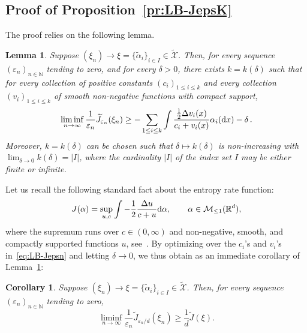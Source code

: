 \documentclass[a4paper,11pt]{amsart}
\numberwithin{equation}{section}
\newtheorem{lemma}[theorem]{Lemma}
\newtheorem{corollary}[theorem]{Corollary}
\newcommand{\bbR}{{\ensuremath{\mathbb R}} }
\newcommand{\cM}{{\ensuremath{\mathcal M}} }
\newcommand{\cX}{{\ensuremath{\mathcal X}} }
\newcommand{\ga}{\alpha}
\newcommand{\gd}{\delta}
\newcommand{\gD}{\Delta}
\newcommand{\gep}{\varepsilon}
\renewcommand{\tilde}{\widetilde}          %
\newcommand{\dd}{\text{\rm d}}             %
\newcommand{\N}{\mathbb{N}}
\newcommand{\8}{\infty}
\newcommand{\beq}{\begin{equation}}
\newcommand{\eeq}{\end{equation}}
\begin{document}
\subsection{Proof of Proposition~\ref{pr:LB-JepsK}}\label{S:LB-JepsK}
The proof relies on the following lemma. 
%
\begin{lemma}
	\label{pr:LB-Jepsn}
	Suppose $(\xi_n) \to \xi = \{\tilde\ga_i\}_{i\in I}\in \tilde\cX$. Then, for every sequence $(\gep_n)_{n\in\N}$ tending to zero, and for every $\gd>0$, there exists $k =k(\gd)$ such that for every collection of positive constants $(c_i)_{1\le i \le k}$ and every collection $(v_i)_{1\le i \le k}$ of smooth non-negative functions with compact support,
	\beq\label{eq:LB-Jepsn}
	\liminf_{n\to\infty}
	\frac{1}{\gep_n} \tilde J_{\gep_n}(\xi_n) \ge
	- \sum_{1\le i \le k} \int \frac{\frac12 \gD v_i(x)}{c_i + v_i(x)} \ga_i(\dd x) - \gd\,.
	\eeq
	Moreover, $k=k(\delta)$ can be chosen such that $\delta\mapsto k(\delta)$ is non-increasing with $\lim_{\delta\to 0}k(\delta)=|I|$, where the cardinality $|I|$ of the index set $I$ may be either finite or infinite.
\end{lemma}
%
Let us recall the following standard fact about the entropy rate function:
\beq
J(\ga) = \sup_{u,c} \int -\frac12\frac{\gD u}{c+u} \dd \ga, \qquad \ga\in\cM_{\le 1}(\bbR^d),
\eeq
where the supremum runs over $c\in(0,\infty)$ and non-negative, smooth, and compactly supported functions $u$, see~\cite[Proof of Lemma 4.7]{MV2016}.
By optimizing over the $c_i$'s and $v_i$'s in~\eqref{eq:LB-Jepsn} and letting $\gd\to 0$, we thus obtain as an immediate corollary of Lemma~\ref{pr:LB-Jepsn}:
\begin{corollary}
\label{cor:LB-Jepsn}
Suppose $(\xi_n) \to \xi = \{\tilde\ga_i\}_{i\in I}\in \tilde\cX$. Then, for every sequence $(\gep_n)_{n\in\N}$ tending to zero,
	\beq
	\liminf_{n\to\infty}
	\frac{1}{\gep_n} \tilde J_{ \gep_n/d}(\xi_n) \ge
	{ \frac1d}\tilde J(\xi).
	\eeq
\end{corollary}
\end{document}
